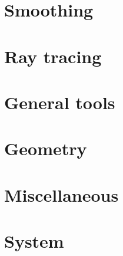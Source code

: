 \chapter{Smoothing}\label{sec:smoothing}


\chapter{Ray tracing}\label{sec:ray}

\chapter{General tools}\label{sec:general}

\chapter{Geometry}\label{sec:geometry}

\chapter{Miscellaneous}\label{sec:misc}

\chapter{System}\label{sec:system}

\cleardoublepage


\printindex
{}
\cleardoublepage



